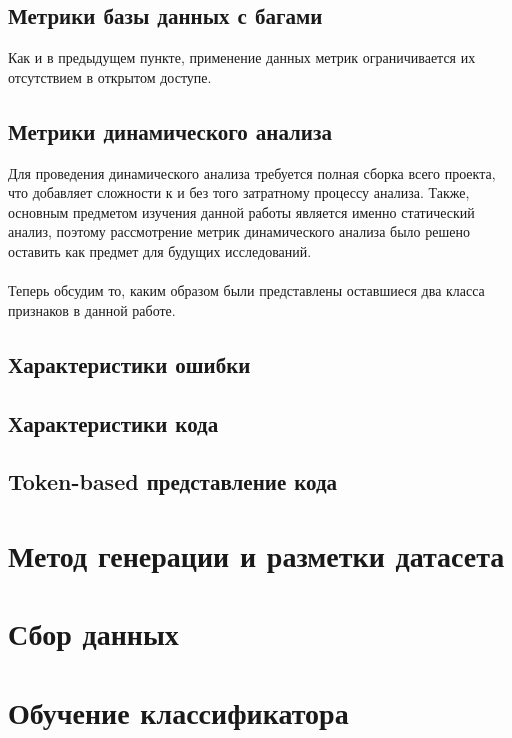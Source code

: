 \subsection{Метрики базы данных с багами}
Как и в предыдущем пункте, применение данных метрик ограничивается их отсутствием в открытом доступе.

\subsection{Метрики динамического анализа}
Для проведения динамического анализа требуется полная сборка всего проекта, что добавляет сложности к и без того затратному процессу анализа. Также, основным предметом изучения данной работы является именно статический анализ, поэтому рассмотрение метрик динамического анализа было решено оставить как предмет для будущих исследований.
\\
\\
Теперь обсудим то, каким образом были представлены оставшиеся два класса признаков в данной работе.

\subsection{Характеристики ошибки}
\label{sec:Err-to-CWE} 

\subsection{Характеристики кода}

\subsection{Token-based представление кода}
\label{sec:Tokens} 

\section{Метод генерации и разметки датасета}

\section{Сбор данных}

\section{Обучение классификатора}

